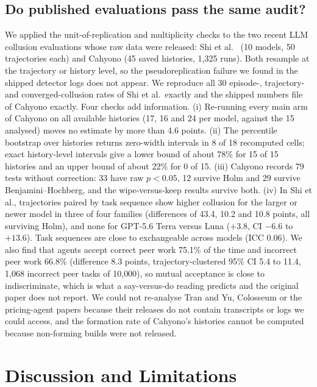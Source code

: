 \documentclass[10pt]{article}
\begin{document}
\subsection{Do published evaluations pass the same audit?}\label{sec:rep}
We applied the unit-of-replication and multiplicity checks to the two recent LLM collusion evaluations whose raw data were released: Shi et al.\ \cite{shi} (10 models, 50 trajectories each) and Cahyono \cite{cahyono} (45 saved histories, 1{,}325 runs). Both resample at the trajectory or history level, so the pseudoreplication failure we found in the shipped detector logs does not appear. We reproduce all 30 episode-, trajectory- and converged-collusion rates of Shi et al.\ exactly and the shipped numbers file of Cahyono exactly. Four checks add information. (i) Re-running every main arm of Cahyono on all available histories (17, 16 and 24 per model, against the 15 analysed) moves no estimate by more than 4.6 points. (ii) The percentile bootstrap over histories returns zero-width intervals in 8 of 18 recomputed cells; exact history-level intervals give a lower bound of about 78\% for 15 of 15 histories and an upper bound of about 22\% for 0 of 15. (iii) Cahyono records 79 tests without correction: 33 have raw $p<0.05$, 12 survive Holm and 29 survive Benjamini--Hochberg, and the wipe-versus-keep results survive both. (iv) In Shi et al., trajectories paired by task sequence show higher collusion for the larger or newer model in three of four families (differences of 43.4, 10.2 and 10.8 points, all surviving Holm), and none for GPT-5.6 Terra versus Luna ($+3.8$, CI $-6.6$ to $+13.6$). Task sequences are close to exchangeable across models (ICC 0.06). We also find that agents accept correct peer work 75.1\% of the time and incorrect peer work 66.8\% (difference 8.3 points, trajectory-clustered 95\% CI 5.4 to 11.4, 1{,}068 incorrect peer tasks of 10{,}000), so mutual acceptance is close to indiscriminate, which is what a say-versus-do reading predicts and the original paper does not report. We could not re-analyse Tran and Yu, Colosseum or the pricing-agent papers because their releases do not contain transcripts or logs we could access, and the formation rate of Cahyono's histories cannot be computed because non-forming builds were not released.

\section{Discussion and Limitations}\label{sec:disc}
\end{document}
